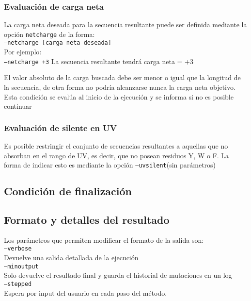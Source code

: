 \subsubsection{Evaluación de carga neta}

La carga neta deseada para la secuencia resultante puede ser definida mediante la opción \texttt{netcharge} de la forma: \\
\indent \texttt{--netcharge [carga neta deseada]} 
\\Por ejemplo: \\
\indent \texttt{--netcharge +3} \hspace{0.5cm} La secuencia resultante tendrá carga neta = +3

El valor absoluto de la carga buscada debe ser menor o igual que la longitud de la secuencia, de otra forma no podría alcanzarse nunca la carga neta objetivo.
Esta condición se evalúa al inicio de la ejecución y se informa si no es posible continuar


\subsubsection{Evaluación de silente en UV}\label{uvsilent}

Es posible restringir el conjunto de secuencias resultantes a aquellas que no absorban en el rango de UV, es decir, que no posean residuos Y, W o F.
La forma de indicar esto es mediante la opción \texttt{--uvsilent}(sin parámetros)



\subsection{Condición de finalización} \label{condicionFin}

\subsection{Formato y detalles del resultado}\label{output}
Los parámetros que permiten modificar el formato de la salida son:
\vspace{0.2cm}\\
\texttt{--verbose} \\
\indent \indent Devuelve una salida detallada de la ejecución \\
\texttt{--minoutput} \\
\indent \indent Solo devuelve el resultado final y guarda el historial de mutaciones en un log \\
\texttt{--stepped} \\
\indent \indent Espera por input del usuario en cada paso del método. \\
